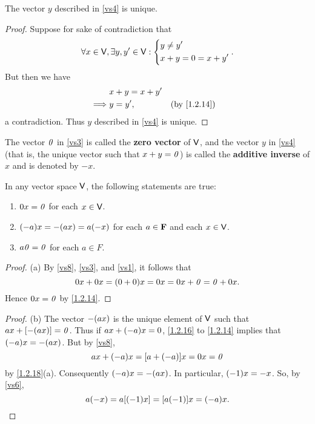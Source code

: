 \begin{cor}\label{1.2.16}
    The vector \(y\) described in \ref{vs4} is unique.
\end{cor}

\begin{proof}
    Suppose for sake of contradiction that
    \[
        \forall x \in \mathsf{V}, \exists y, y' \in \mathsf{V} : \begin{dcases}
            y \neq y' \\
            x + y = 0 = x + y'
        \end{dcases}.
    \]
    But then we have
    \begin{align*}
                 & x + y = x + y'                                \\
        \implies & y = y',        &  & \text{(by \cref{1.2.14})}
    \end{align*}
    a contradiction.
    Thus \(y\) described in \ref{vs4} is unique.
\end{proof}

\begin{defn}\label{1.2.17}
    The vector \(\mathit{0}\) in \ref{vs3} is called the \textbf{zero vector} of \(\mathsf{V}\), and the vector \(y\) in \ref{vs4} (that is, the unique vector such that \(x + y = \mathit{0}\)) is called the \textbf{additive inverse} of \(x\) and is denoted by \(-x\).
\end{defn}

\begin{thm}\label{1.2.18}
    In any vector space \(\mathsf{V}\), the following statements are true:
    \begin{enumerate}
        \item \(0x = \mathit{0}\) for each \(x \in \mathsf{V}\).
        \item \(\p{-a}x = -\p{ax} = a\p{-x}\) for each \(a \in \mathbf{F}\) and each \(x \in \mathsf{V}\).
        \item \(a\mathit{0} = \mathit{0}\) for each \(a \in F\).
    \end{enumerate}
\end{thm}

\begin{proof}{(a)}
    By \ref{vs8}, \ref{vs3}, and \ref{vs1}, it follows that
    \[
        0x + 0x = \p{0 + 0} x = 0x = 0x + \zv = \zv + 0x.
    \]
    Hence \(0x = \mathit{0}\) by \cref{1.2.14}.
\end{proof}

\begin{proof}{(b)}
    The vector \(-\p{ax}\) is the unique element of \(\mathsf{V}\) such that \(ax + \bk{-\p{ax}} = \zv\).
    Thus if \(ax + \p{-a}x = 0\), \cref{1.2.16} to \cref{1.2.14} implies that \(\p{-a}x = -\p{ax}\).
    But by \ref{vs8},
    \[
        ax + \p{-a}x = \bk{a + \p{-a}}x = 0x = \zv
    \]
    by \cref{1.2.18}(a).
    Consequently \(\p{-a}x = -\p{ax}\).
    In particular, \(\p{-1}x = -x\).
    So, by \ref{vs6},
    \[
        a\p{-x} = a\bk{\p{-1}x} = \bk{a\p{-1}}x = \p{-a}x.
    \]
\end{proof}


